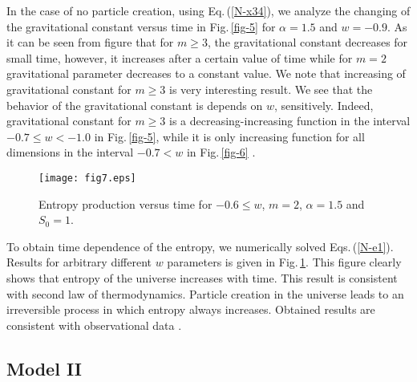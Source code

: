 \documentclass[superscriptaddress,showpacs,pre,twocolumn]{revtex4-1}
\begin{document}
In the case of no particle creation, using Eq.\,(\ref{N-x34}), we analyze the changing of the gravitational constant versus time in Fig.\,\ref{fig-5} for $\alpha=1.5$ and $w=-0.9$. As it can be seen from figure that for $m\ge 3$, the gravitational constant decreases for small time, however, it increases after a certain value of time while for $m=2$ gravitational parameter decreases to a constant value. We note that increasing of gravitational constant for $m\ge 3$ is very interesting result. We see that the behavior of the gravitational constant is depends on $w$, sensitively. Indeed, gravitational constant for $m\ge 3$ is a decreasing-increasing function in the interval $-0.7 \le w < -1.0$ in Fig.\,\ref{fig-5}, while it is only increasing function for all dimensions in the interval $-0.7 < w$ in Fig.\,\ref{fig-6} .
\begin{figure} [ht!]
	\centering
	\texttt{[image: fig7.eps]}
	\caption{Entropy production versus time for $-0.6 \le w$, $m=2$, $\alpha=1.5$  and $S_{0}=1$.}
	\label{fig-7}
\end{figure}

To obtain time dependence of the entropy, we numerically solved Eqs.\,(\ref{N-e1}). Results for arbitrary different $w$ parameters is given in Fig.\,\ref{fig-7}. This figure clearly shows that entropy of the universe increases with time. This result is consistent with second law of thermodynamics. Particle creation in the universe leads to an irreversible process in which entropy always increases. Obtained results are consistent with observational data \cite{xKay2004}.

\subsection{Model II} 
\end{document}

